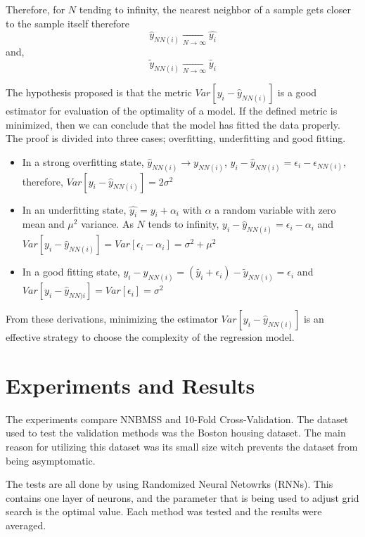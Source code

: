 \documentclass[a4paper]{article}
\begin{document}
Therefore, for $N$ tending to infinity, the nearest neighbor of a sample gets closer to the sample itself therefore
\begin{equation}
\hat{y}_{NN(i)} \underset{N\rightarrow\infty}{\rightarrow}  \hat{y_i}
\end{equation}
and,
\begin{equation}
\widetilde{y}_{NN(i)} \underset{N\rightarrow\infty}{\rightarrow}  \widetilde{y_i}
\end{equation}

The hypothesis proposed is that the metric $Var[y_i - \hat{y}_{NN(i)}]$ is a good estimator for evaluation of the optimality of a model. If the defined metric is minimized, then we can conclude that the model has fitted the data properly. The proof is divided into three cases; overfitting, underfitting and good fitting.
\begin{itemize}
    \item In a strong overfitting state, $\hat{y}_{NN(i)} \rightarrow y_{NN(i)}$, $y_i - \hat{y}_{NN(i)} = \epsilon_i - \epsilon_{NN(i)}$, therefore, $Var[y_i - \hat{y}_{NN(i)}] = 2\sigma^2$
    \item In an underfitting state, $\hat{y_i} = y_i + \alpha_i$ with $\alpha$ a random variable with zero mean and $\mu^2$ variance. As $N$ tends to infinity, $y_i - \hat{y}_{NN(i)} = \epsilon_i - \alpha_i$ and $Var[y_i - \hat{y}_{NN(i)}] = Var[\epsilon_i - \alpha_i] = \sigma^2 + \mu^2$
    \item In a good fitting state, $y_i - \hat{y}_{NN(i)} = (\widetilde{y_i}+\epsilon_i)-\widetilde{y}_{NN(i)} = \epsilon_i$ and $Var[y_i - \hat{y}_{NN)i}] = Var[\epsilon_i] = \sigma^2$
\end{itemize}

From these derivations, minimizing the estimator $Var[y_i - \hat{y}_{NN(i)}]$ is an effective strategy to choose the complexity of the regression model.
\section{Experiments and Results}

The experiments compare NNBMSS and 10-Fold Cross-Validation. The dataset used to test the validation methods was the Boston housing dataset. The main reason for utilizing this dataset was its small size witch prevents the dataset from being asymptomatic. 

The tests are all done by using Randomized Neural Netowrks (RNNs).  This contains one layer of neurons, and the parameter that is being used to adjust grid search is the optimal value. Each method was tested and the results were averaged.
\end{document}
